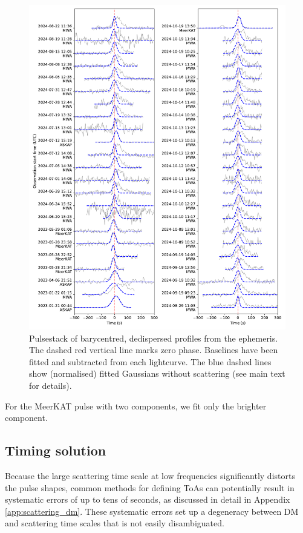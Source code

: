 \documentclass[fleqn,usenatbib]{mnras}
\begin{document}
\begin{figure}[tp]
      \centering
          \includegraphics[width=0.95\linewidth]{pulsestack.pdf}
              \caption{Pulsestack of barycentred, dedispersed profiles from the ephemeris. The dashed red vertical line marks zero phase. Baselines have been fitted and subtracted from each lightcurve. The blue dashed lines show (normalised) fitted Gaussians without scattering (see main text for details).}
                  \label{fig:pulsestack}
\end{figure}

For the MeerKAT pulse with two components, we fit only the brighter component.

\subsection{Timing solution} \label{sec:timing}

Because the large scattering time scale at low frequencies significantly distorts the pulse shapes, common methods for defining ToAs can potentially result in systematic errors of up to tens of seconds, as discussed in detail in Appendix \ref{app:scattering_dm}.
These systematic errors set up a degeneracy between DM and scattering time scales that is not easily disambiguated.
\end{document}
